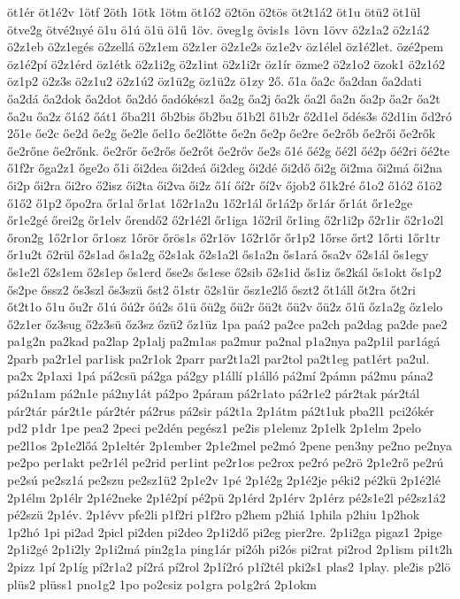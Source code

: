 {öt1ér
öt1é2v
1ötf
2öth
1ötk
1ötm
öt1ó2
ö2tön
ö2tös
öt2t1á2
öt1u
ötü2
öt1ül
ötve2g
ötvé2nyé
ö1u
ö1ú
ö1ü
ö1ű
1öv.
öveg1g
övis1s
1övn
1övv
ö2z1a2
ö2z1á2
ö2z1eb
ö2z1egés
ö2zellá
ö2z1em
ö2z1er
ö2z1e2s
öz1e2v
öz1élel
öz1é2let.
özé2pem
öz1é2pí
ö2z1érd
öz1étk
ö2z1i2g
ö2z1int
ö2z1i2r
öz1ír
özme2
ö2z1o2
özok1
ö2z1ó2
öz1p2
ö2z3s
ö2z1u2
ö2z1ú2
öz1ü2g
öz1ü2z
ö1zy
2ő.
ő1a
őa2c
őa2dan
őa2dati
őa2dá
őa2dok
őa2dot
őa2dó
őadókész1
őa2g
őa2j
őa2k
őa2l
őa2n
őa2p
őa2r
őa2t
őa2u
őa2z
ő1á2
őát1
őba2l1
őb2bis
őb2bu
ő1b2l
ő1b2r
ő2d1el
ődés3s
ő2d1in
őd2ró
2ő1e
őe2c
őe2d
őe2g
őe2le
őel1o
őe2lőtte
őe2n
őe2p
őe2re
őe2rőb
őe2rői
őe2rők
őe2rőne
őe2rőnk.
őe2rőr
őe2rős
őe2rőt
őe2rőv
őe2s
ő1é
őé2g
őé2l
őé2p
őé2ri
őé2te
ő1f2r
őga2z1
őge2o
ő1i
ői2dea
ői2deá
ői2deg
ői2dé
ői2dő
ői2g
ői2ma
ői2má
ői2na
ői2p
ői2ra
ői2ro
ő2isz
ői2ta
ői2va
ői2z
ő1í
őí2r
őí2v
őjob2
ő1k2ré
ő1o2
ő1ó2
ő1ö2
ő1ő2
ő1p2
őpo2ra
őr1al
őr1at
1ő2r1a2u
1ő2r1ál
őr1á2p
őr1ár
őr1át
őr1e2ge
őr1e2gé
őrei2g
őr1elv
őrendő2
ő2r1é2l
őr1iga
1ő2ril
őr1ing
ő2r1i2p
ő2r1ir
ő2r1o2l
őron2g
1ő2r1or
őr1osz
1őrör
őrös1s
ő2r1öv
1ő2r1őr
őr1p2
1őrse
őrt2
1őrti
1őr1tr
őr1u2t
ő2rül
ő2s1ad
ős1a2g
ő2s1ak
ő2s1a2l
ős1a2n
ős1ará
ősa2v
ő2s1ál
ős1egy
ős1e2l
ő2s1em
ő2s1ep
ős1erd
őse2s
ős1ese
ő2sib
ő2s1id
ős1iz
ős2kál
ős1okt
ős1p2
ős2pe
őssz2
ős3szl
ős3szü
őst2
ő1str
ő2s1ür
ősz1e2lő
őszt2
őt1áll
őt2ra
őt2ri
őt2t1o
ő1u
őu2r
ő1ú
őú2r
őú2s
ő1ü
őü2g
őü2r
őü2t
őü2v
őü2z
ő1ű
őz1a2g
őz1elo
ő2z1er
őz3sug
ő2z3sü
őz3sz
őzü2
őz1üz
1pa
paá2
pa2ce
pa2ch
pa2dag
pa2de
pae2
pa1g2n
pa2kad
pa2lap
2p1alj
pa2m1as
pa2mur
pa2nal
p1a2nya
pa2p1il
par1ágá
2parb
pa2r1el
par1isk
pa2r1ok
2parr
par2t1a2l
par2tol
pa2t1eg
pat1ért
pa2ul.
pa2x
2p1axi
1pá
pá2csü
pá2ga
pá2gy
p1állí
p1álló
pá2mí
2pámn
pá2mu
pána2
pá2n1am
pá2n1e
pá2ny1át
pá2po
2páram
pá2r1ato
pá2r1e2
pár2tak
pár2tál
pár2tár
pár2t1e
pár2tér
pá2rus
pá2sir
pá2t1a
2p1átm
pá2t1uk
pba2l1
pci2ókér
pd2
p1dr
1pe
pea2
2peci
pe2dén
pegész1
pe2is
p1elemz
2p1elk
2p1elm
2pelo
pe2l1os
2p1e2lőá
2p1eltér
2p1ember
2p1e2mel
pe2mó
2pene
pen3ny
pe2no
pe2nya
pe2po
per1akt
pe2r1él
pe2rid
per1int
pe2r1os
pe2rox
pe2ró
pe2rö
2p1e2rő
pe2rú
pe2sú
pe2sz1á
pe2szu
pe2sz1ü2
2p1e2v
1pé
2p1é2g
2p1é2je
péki2
pé2kü
2p1é2lé
2p1élm
2p1élr
2p1é2neke
2p1é2pí
pé2pü
2p1érd
2p1érv
2p1érz
pé2s1e2l
pé2sz1á2
pé2szü
2p1év.
2p1évv
pfe2li
p1f2ri
p1f2ro
p2hem
p2hiá
1phila
p2hiu
1p2hok
1p2hó
1pi
pi2ad
2picl
pi2den
pi2deo
2p1i2dő
pi2eg
pier2re.
2p1i2ga
pigaz1
2pige
2p1i2gé
2p1i2ly
2p1i2má
pin2g1a
ping1ár
pi2óh
pi2ós
pi2rat
pi2rod
2p1ism
pi1t2h
2pizz
1pí
2p1íg
pí2r1a2
pí2rá
pí2rol
2p1í2ró
p1í2tél
pki2s1
plas2
1play.
ple2is
p2lö
plüs2
plüss1
pno1g2
1po
po2csiz
po1gra
po1g2rá
2p1okm
}
